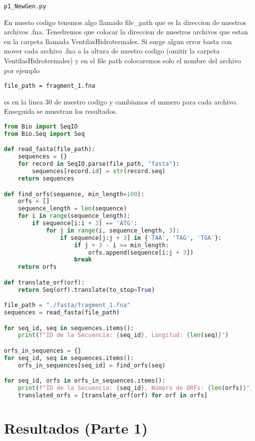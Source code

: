 \begin{verbatim}
p1_NewGen.py
\end{verbatim}

En nuesto codigo tenemos algo llamado file\_path que es la direccion de nuestros archivos .fna. Tenedremos que colocar la direccion de nuestros archivos que estan en la carpeta llamada VentilasHidrotermales. Si surge algun error basta con mover cada archivo .fna a la altura de nuestro codigo (omitir la carpeta VentilasHidrotermales) y en el file path colocaremos solo el nombre del archivo por ejemplo
 \begin{verbatim}
file_path = fragment_1.fna
\end{verbatim} 
es en la linea 30 de nuestro codigo y cambiamos el numero para cada archivo. Enseguida se muestran los resultados.


\begin{lstlisting}[language=Python]
from Bio import SeqIO
from Bio.Seq import Seq

def read_fasta(file_path):
    sequences = {}
    for record in SeqIO.parse(file_path, "fasta"):
        sequences[record.id] = str(record.seq)
    return sequences

def find_orfs(sequence, min_length=100):
    orfs = []
    sequence_length = len(sequence)
    for i in range(sequence_length):
        if sequence[i:i + 3] == 'ATG':
            for j in range(i, sequence_length, 3):
                if sequence[j:j + 3] in {'TAA', 'TAG', 'TGA'}:
                    if j + 3 - i >= min_length:
                        orfs.append(sequence[i:j + 3])
                    break
    return orfs

def translate_orf(orf):
    return Seq(orf).translate(to_stop=True)

file_path = "./fasta/fragment_1.fna"
sequences = read_fasta(file_path)

for seq_id, seq in sequences.items():
    print(f"ID de la Secuencia: {seq_id}, Longitud: {len(seq)}")

orfs_in_sequences = {}
for seq_id, seq in sequences.items():
    orfs_in_sequences[seq_id] = find_orfs(seq)

for seq_id, orfs in orfs_in_sequences.items():
    print(f"ID de la Secuencia: {seq_id}, Número de ORFs: {len(orfs)}")
    translated_orfs = [translate_orf(orf) for orf in orfs]
\end{lstlisting}

\section*{Resultados (Parte 1)}

